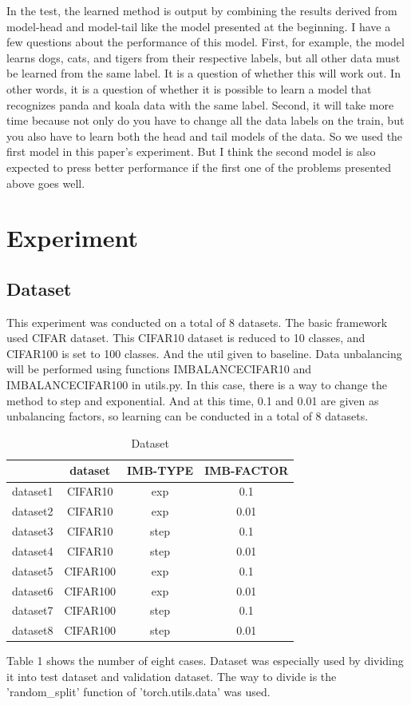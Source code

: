 \documentclass[extendedabs]{bmvc2k}
\begin{document}
    In the test, the learned method is output by combining the results derived from model-head and model-tail like the model presented at the beginning.
    I have a few questions about the performance of this model. First, for example, the model learns dogs, cats, and tigers from their respective labels, 
    but all other data must be learned from the same label. It is a question of whether this will work out. In other words, 
    it is a question of whether it is possible to learn a model that recognizes panda and koala data with the same label. 
    Second, it will take more time because not only do you have to change all the data labels on the train, but you also have to learn both the head and tail models of the data.
    \newline So we used the first model in this paper's experiment. But I think the second model is also expected to press better performance if the first one of the problems presented above goes well.

\section{Experiment} 
  \subsection{Dataset}
  \quad This experiment was conducted on a total of 8 datasets. The basic framework used CIFAR dataset. This CIFAR10 dataset is reduced to 10 classes, and CIFAR100 is set to 100 classes.
  And the util given to baseline. Data unbalancing will be performed using functions IMBALANCECIFAR10 and IMBALANCECIFAR100 in utils.py. 
  In this case, there is a way to change the method to step and exponential. And at this time, 0.1 and 0.01 are given as unbalancing factors, so learning can be conducted in a total of 8 datasets.
  \begin{table}
    \centering
    \caption{Dataset}
    \label{t1}
    \begin{tabular}{|c|c|c|c|}
    \noalign{\smallskip}\noalign{\smallskip}\hline
    & dataset & IMB-TYPE & IMB-FACTOR \\
    \hline
    dataset1 & CIFAR10 & exp & 0.1 \\
    \hline
    dataset2 & CIFAR10 & exp & 0.01 \\
    \hline
    dataset3 & CIFAR10 & step & 0.1 \\
    \hline
    dataset4 & CIFAR10 & step & 0.01 \\
    \hline
    dataset5 & CIFAR100 & exp & 0.1 \\
    \hline
    dataset6 & CIFAR100 & exp & 0.01 \\
    \hline
    dataset7 & CIFAR100 & step & 0.1 \\
    \hline
    dataset8 & CIFAR100 & step & 0.01 \\
    \hline
    \end{tabular}
  \end{table}
  Table 1 shows the number of eight cases.
  Dataset was especially used by dividing it into test dataset and validation dataset. The way to divide is the 'random\_split' function of 'torch.utils.data' was used.
\end{document}

